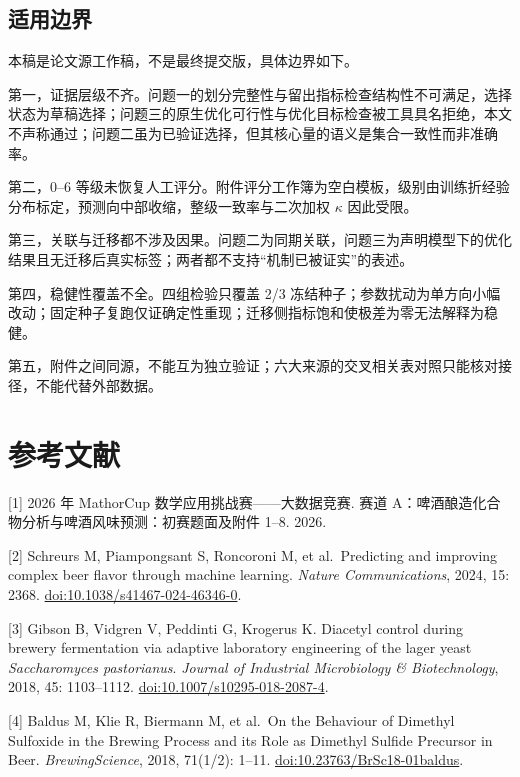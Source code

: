 \documentclass[11pt,a4paper]{article}
\begin{document}
\subsection{适用边界}\label{ux9002ux7528ux8fb9ux754c}

本稿是论文源工作稿，不是最终提交版，具体边界如下。

第一，证据层级不齐。问题一的划分完整性与留出指标检查结构性不可满足，选择状态为草稿选择；问题三的原生优化可行性与优化目标检查被工具具名拒绝，本文不声称通过；问题二虽为已验证选择，但其核心量的语义是集合一致性而非准确率。

第二，0--6
等级未恢复人工评分。附件评分工作簿为空白模板，级别由训练折经验分布标定，预测向中部收缩，整级一致率与二次加权
\(\kappa\) 因此受限。

第三，关联与迁移都不涉及因果。问题二为同期关联，问题三为声明模型下的优化结果且无迁移后真实标签；两者都不支持``机制已被证实''的表述。

第四，稳健性覆盖不全。四组检验只覆盖 2/3
冻结种子；参数扰动为单方向小幅改动；固定种子复跑仅证确定性重现；迁移侧指标饱和使极差为零无法解释为稳健。

第五，附件之间同源，不能互为独立验证；六大来源的交叉相关表对照只能核对接径，不能代替外部数据。

\section*{参考文献}\label{ux53c2ux8003ux6587ux732e}

{[}1{]} 2026 年 MathorCup 数学应用挑战赛------大数据竞赛. 赛道
A：啤酒酿造化合物分析与啤酒风味预测：初赛题面及附件 1--8. 2026.

{[}2{]} Schreurs M, Piampongsant S, Roncoroni M, et al.~Predicting and
improving complex beer flavor through machine learning. \emph{Nature
Communications}, 2024, 15: 2368.
\href{https://doi.org/10.1038/s41467-024-46346-0}{doi:10.1038/s41467-024-46346-0}.

{[}3{]} Gibson B, Vidgren V, Peddinti G, Krogerus K. Diacetyl control
during brewery fermentation via adaptive laboratory engineering of the
lager yeast \emph{Saccharomyces pastorianus}. \emph{Journal of
Industrial Microbiology \& Biotechnology}, 2018, 45: 1103--1112.
\href{https://doi.org/10.1007/s10295-018-2087-4}{doi:10.1007/s10295-018-2087-4}.

{[}4{]} Baldus M, Klie R, Biermann M, et al.~On the Behaviour of
Dimethyl Sulfoxide in the Brewing Process and its Role as Dimethyl
Sulfide Precursor in Beer. \emph{BrewingScience}, 2018, 71(1/2): 1--11.
\href{https://doi.org/10.23763/BrSc18-01baldus}{doi:10.23763/BrSc18-01baldus}.
\end{document}
